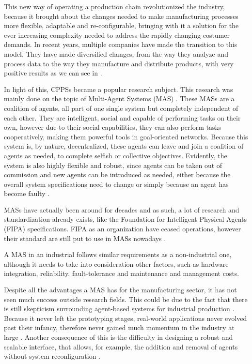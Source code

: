 This new way of operating a production chain revolutionized the industry, because it brought about the changes needed to make manufacturing processes more flexible, adaptable and re-configurable, bringing with it a solution for the ever increasing complexity needed to address the rapidly changing costumer demands.
In recent years, multiple companies have made the transition to this model. They have made diversified changes, from the way they analyze and process data to the way they manufacture and distribute products, with very positive results as we can see in \cite{rit01}.


In light of this, CPPSs became a popular research subject. This research was mainly done on the topic of Multi-Agent Systems (MAS) \cite{sakurada01} \cite{karnouskos01}. These MASs are a coalition of agents, all part of one single system but completely independent of each other. They are intelligent, social and capable of performing tasks on their own, however due to their social capabilities, they can also perform tasks cooperatively, making them powerful tools in goal-oriented networks. Because this system is, by nature, decentralized, these agents can leave and join a coalition of agents as needed, to complete selfish or collective objectives. Evidently, the system is also highly flexible and robust, since agents can be taken out of commission and new agents can be introduced as needed, either because the overall system specifications need to change or simply because an agent has become faulty \cite{paulo02}.

MASs have actually been around for decades and as such, a lot of research and standardization already exists, like the Foundation for Intelligent Physical Agents (FIPA) specifications. FIPA as an organization have ceased operations, however their standard are still put to use in MASs nowadays \cite{FIPA_website}.

A MAS in an industrial follows similar requirements as a non-industrial one, although it needs to take into consideration other factors, such as hardware integration, reliability, fault-tolerance and maintenance and management costs.

Despite all the advantages a MAS has for the manufacturing sector, it has not seen much success outside research fields. This could be due to the fact that there is still skepticism surrounding agent-based systems for industrial production \cite{marschall01}. Because it never left the prototyping stages, real-world applications never evolved past their infancy, therefore never gained much momentum in the industry at large \cite{karnouskos02}. Another consequence of this is the difficulty in designing a robust and scalable interface, that allows, for example, the addition and removal of agents without system reconfiguration \cite{}.